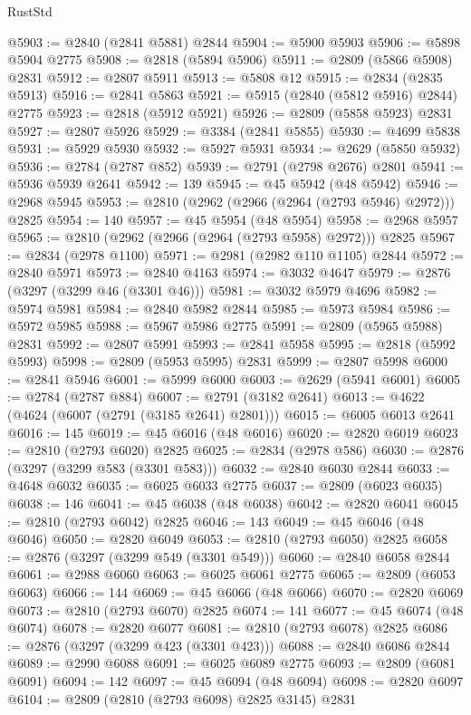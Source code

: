 \begin{lexlean}{RustStd}
\begin{coremodule}
@5903 := @2840 (@2841 @5881) @2844
@5904 := @5900 @5903
@5906 := @5898 @5904 @2775
@5908 := @2818 (@5894 @5906)
@5911 := @2809 (@5866 @5908) @2831
@5912 := @2807 @5911
@5913 := @5808 @12
@5915 := @2834 (@2835 @5913)
@5916 := @2841 @5863
@5921 := @5915 (@2840 (@5812 @5916) @2844) @2775
@5923 := @2818 (@5912 @5921)
@5926 := @2809 (@5858 @5923) @2831
@5927 := @2807 @5926
@5929 := @3384 (@2841 @5855)
@5930 := @4699 @5838
@5931 := @5929 @5930
@5932 := @5927 @5931
@5934 := @2629 (@5850 @5932)
@5936 := @2784 (@2787 @852)
@5939 := @2791 (@2798 @2676) @2801
@5941 := @5936 @5939 @2641
@5942 := 139
@5945 := @45 @5942 (@48 @5942)
@5946 := @2968 @5945
@5953 := @2810 (@2962 (@2966 (@2964 (@2793 @5946) @2972))) @2825
@5954 := 140
@5957 := @45 @5954 (@48 @5954)
@5958 := @2968 @5957
@5965 := @2810 (@2962 (@2966 (@2964 (@2793 @5958) @2972))) @2825
@5967 := @2834 (@2978 @1100)
@5971 := @2981 (@2982 @110 @1105) @2844
@5972 := @2840 @5971
@5973 := @2840 @4163
@5974 := @3032 @4647
@5979 := @2876 (@3297 (@3299 @46 (@3301 @46)))
@5981 := @3032 @5979 @4696
@5982 := @5974 @5981
@5984 := @2840 @5982 @2844
@5985 := @5973 @5984
@5986 := @5972 @5985
@5988 := @5967 @5986 @2775
@5991 := @2809 (@5965 @5988) @2831
@5992 := @2807 @5991
@5993 := @2841 @5958
@5995 := @2818 (@5992 @5993)
@5998 := @2809 (@5953 @5995) @2831
@5999 := @2807 @5998
@6000 := @2841 @5946
@6001 := @5999 @6000
@6003 := @2629 (@5941 @6001)
@6005 := @2784 (@2787 @884)
@6007 := @2791 (@3182 @2641)
@6013 := @4622 (@4624 (@6007 (@2791 (@3185 @2641) @2801)))
@6015 := @6005 @6013 @2641
@6016 := 145
@6019 := @45 @6016 (@48 @6016)
@6020 := @2820 @6019
@6023 := @2810 (@2793 @6020) @2825
@6025 := @2834 (@2978 @586)
@6030 := @2876 (@3297 (@3299 @583 (@3301 @583)))
@6032 := @2840 @6030 @2844
@6033 := @4648 @6032
@6035 := @6025 @6033 @2775
@6037 := @2809 (@6023 @6035)
@6038 := 146
@6041 := @45 @6038 (@48 @6038)
@6042 := @2820 @6041
@6045 := @2810 (@2793 @6042) @2825
@6046 := 143
@6049 := @45 @6046 (@48 @6046)
@6050 := @2820 @6049
@6053 := @2810 (@2793 @6050) @2825
@6058 := @2876 (@3297 (@3299 @549 (@3301 @549)))
@6060 := @2840 @6058 @2844
@6061 := @2988 @6060
@6063 := @6025 @6061 @2775
@6065 := @2809 (@6053 @6063)
@6066 := 144
@6069 := @45 @6066 (@48 @6066)
@6070 := @2820 @6069
@6073 := @2810 (@2793 @6070) @2825
@6074 := 141
@6077 := @45 @6074 (@48 @6074)
@6078 := @2820 @6077
@6081 := @2810 (@2793 @6078) @2825
@6086 := @2876 (@3297 (@3299 @423 (@3301 @423)))
@6088 := @2840 @6086 @2844
@6089 := @2990 @6088
@6091 := @6025 @6089 @2775
@6093 := @2809 (@6081 @6091)
@6094 := 142
@6097 := @45 @6094 (@48 @6094)
@6098 := @2820 @6097
@6104 := @2809 (@2810 (@2793 @6098) @2825 @3145) @2831

\end{coremodule}
\end{lexlean}
